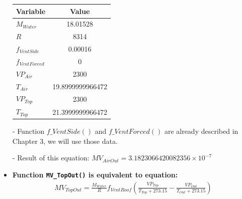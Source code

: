 \documentclass[a4paper]{article}
\numberwithin{equation}{section}
\begin{document}
\begin{itemize}
        \begin{table}[H]
          \centering
          \begin{tabular}{@{}lS[table-format=4.13]@{}}
            \toprule
            \textbf{Variable}  & \textbf{Value}   \\
            \midrule
            \(M_{Water}\)      & 18.01528         \\
            \(R\)              & 8314             \\
            \(f_{VentSide}\)   & 0.00016          \\
            \(f_{VentForced}\) & 0                \\
            \(VP_{Air}\)       & 2300             \\
            \(T_{Air}\)        & 19.8999999966472 \\
            \(VP_{Top}\)       & 2300             \\
            \(T_{Top}\)        & 21.3999999966472 \\
            \bottomrule
          \end{tabular}
        \end{table}
  \item [-] Function \hyperref[fVentSide]{\underline{\(f\_VentSide()\)}} and \hyperref[fVentForced]{\underline{\(f\_VentForced()\)}} are already described in Chapter 3, we will use those data.
  \item[-] Result of this equation: \(MV_{AirOut} = 3.1823066420082356 \times 10^{-7} \)

  \item \textbf{Function \texttt{MV\_TopOut()} is equivalent to equation:}
        \begin{align*}
          MV_{TopOut}  = \frac{M_{Water}}{R} f_{VentRoof} (\frac{VP_{Top}}{T_{Top} + 273.15} - \frac{VP_{Out}}{T_{Out} + 273.15})
        \end{align*}


\end{itemize}
\end{document}
